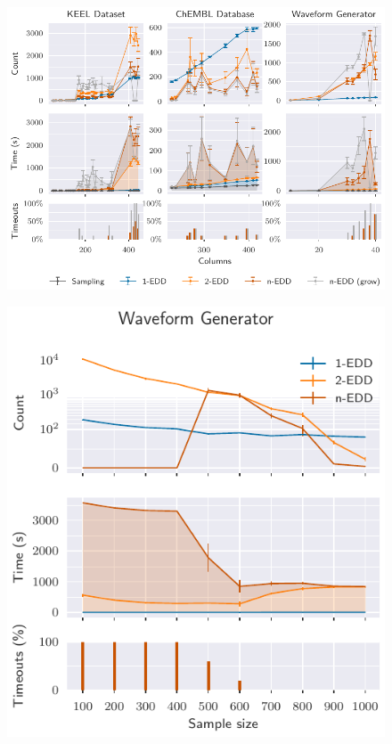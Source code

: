 \documentclass[10pt]{beamer}
\begin{document}
\begin{frame}{}
\begin{figure}
    \centering
    \includegraphics[width=\textwidth]{scalability.pdf}
\end{figure}
\end{frame}

\begin{frame}{}
\begin{figure}
    \centering
    \includegraphics[height=\textheight]{scalability_sample_wave.pdf}
\end{figure}
\end{frame}
\end{document}

